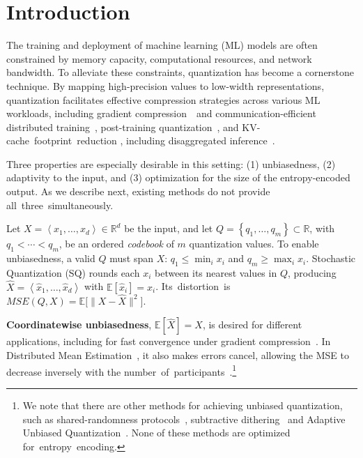 \documentclass[11pt,letterpaper]{article}
\newcommand{\E}{\mathbb{E}}
\newcommand{\angles}[1]{\left\langle#1\right\rangle}
\newcommand{\set}[1]{\left\{#1\right\}}
\begin{document}
\section{Introduction}
\vspace*{1mm}
\label{sec:introduction}

The training and deployment of machine learning (ML) models are often constrained by memory capacity, computational resources, and network bandwidth. To alleviate these constraints, quantization has become a cornerstone technique. By mapping high-precision values to low-width representations, quantization facilitates effective compression strategies across various ML workloads, including gradient compression~\cite{ramezani2021nuqsgd,konevcny2018randomized,vargaftik2022eden,han2024beyond}\ifarxiv\ and communication-efficient distributed training~\cite{li2024thc,chen2024ml,han2026dynamiq,zhao2026mlforml}\fi, post-training quantization~\cite{frantar2023optq,jeon2023frustratingly}, and \mbox{KV-cache footprint reduction} \cite{sheng2023flexgen,liu2024minicache}\ifarxiv, including disaggregated inference~\cite{zhang2025hack}\fi.

Three properties are especially desirable in this setting: (1) unbiasedness, (2) adaptivity to the input, and (3) optimization for the size of the entropy-encoded output. As we describe next, existing methods do not provide \mbox{all three simultaneously.}

Let $X=\angles{x_1,\ldots,x_d}\in\mathbb R^d$ be the input, and let $Q=\set{q_1,\ldots,q_m}\subset\mathbb R$, with $q_1<\cdots<q_m$, be an ordered \emph{codebook} of $m$ quantization values. To enable unbiasedness, a valid $Q$ must span $X$: $q_1\le\min_i x_i$ and $q_m\ge\max_i x_i$. Stochastic Quantization (SQ) rounds each $x_i$ between its nearest values in $Q$, producing $\widehat X=\angles{\widehat x_1,\ldots,\widehat x_d}$ with $\E[\widehat x_i]=x_i$. \mbox{Its distortion is} $MSE(Q,X)=\E\big[\lVert X-\widehat X\rVert^2\big]$.

\textbf{Coordinatewise \textbf{unbiasedness}}, $\E[\widehat X]=X$, is desired for different applications, including for fast convergence under gradient compression~\cite{NIPS2017_6c340f25,castroquartet}. In Distributed Mean Estimation~\cite{pmlr-v70-suresh17a}, it also makes errors cancel, allowing the MSE to decrease inversely with the \mbox{number of participants}~\cite{vargaftik2021drive, basat2024quick}.\footnote{We note that there are other methods for achieving unbiased quantization, such as \ifarxiv shared-randomness protocols~\cite{ben2021send}, \fi subtractive dithering~\cite{rapp2019estimation} and Adaptive Unbiased Quantization\ifarxiv~\cite{basat2025better}\fi. None of these methods are optimized \mbox{for entropy encoding.}}
\end{document}
